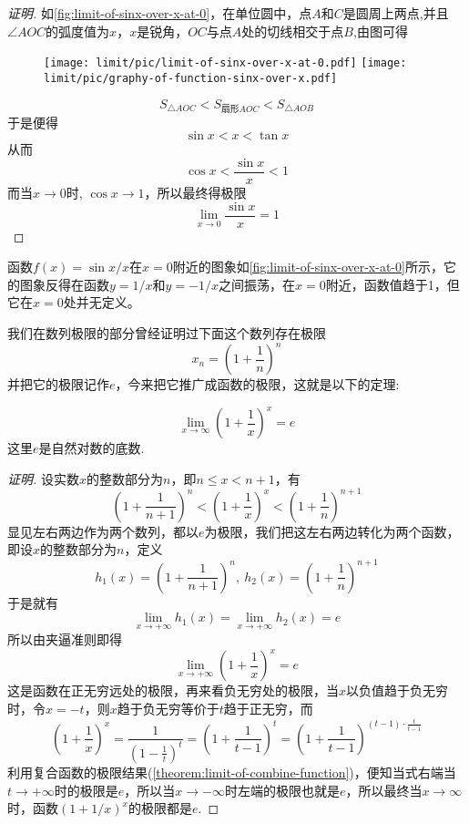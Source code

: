 \begin{proof}[证明]

  如\autoref{fig:limit-of-sinx-over-x-at-0}，在单位圆中，点$A$和$C$是圆周上两点,并且$\angle AOC$的弧度值为$x$，$x$是锐角，$OC$与点$A$处的切线相交于点$B$,由图可得
  
\begin{figure}[htbp]
\centering
\texttt{[image: limit/pic/limit-of-sinx-over-x-at-0.pdf]}
\texttt{[image: limit/pic/graphy-of-function-sinx-over-x.pdf]}
\caption{}
\label{fig:limit-of-sinx-over-x-at-0}
\end{figure}

  \[ S_{\triangle AOC} < S_{\text{扇形}AOC} < S_{\triangle AOB} \]
  于是便得
  \[ \sin{x} < x < \tan{x} \]
  从而
  \[ \cos{x} < \frac{\sin{x}}{x} < 1 \]
  而当$x \to 0$时, $\cos{x} \to 1$，所以最终得极限
  \[ \lim_{x \to 0} \frac{\sin{x}}{x} = 1 \]
\end{proof}

函数$f(x)=\sin{x}/x$在$x=0$附近的图象如\autoref{fig:limit-of-sinx-over-x-at-0}所示，它的图象反得在函数$y=1/x$和$y=-1/x$之间振荡，在$x=0$附近，函数值趋于1，但它在$x=0$处并无定义。

我们在数列极限的部分曾经证明过下面这个数列存在极限
\[ x_n = \left( 1+\frac{1}{n} \right)^n \]
并把它的极限记作$e$，今来把它推广成函数的极限，这就是以下的定理:
\begin{theorem}
  \[ \lim_{x \to \infty} \left( 1+\frac{1}{x} \right)^x = e \]
  这里$e$是自然对数的底数.
\end{theorem}

\begin{proof}[证明]
  设实数$x$的整数部分为$n$，即$n \leqslant x < n+1$，有
  \[ \left( 1+\frac{1}{n+1} \right)^n < \left( 1+\frac{1}{x} \right)^x < \left( 1+\frac{1}{n} \right)^{n+1} \]
  显见左右两边作为两个数列，都以$e$为极限，我们把这左右两边转化为两个函数，即设$x$的整数部分为$n$，定义
  \[ h_1(x) =  \left( 1+\frac{1}{n+1} \right)^n, \ h_2(x)=\left( 1+\frac{1}{n} \right)^{n+1} \]
  于是就有
  \[ \lim_{x \to +\infty} h_1(x) = \lim_{x \to +\infty} h_2(x) = e \]
  所以由夹逼准则即得
  \[ \lim_{x \to +\infty} \left( 1+\frac{1}{x} \right)^x = e \]
  这是函数在正无穷远处的极限，再来看负无穷处的极限，当$x$以负值趋于负无穷时，令$x=-t$，则$x$趋于负无穷等价于$t$趋于正无穷，而
  \[ \left( 1+\frac{1}{x} \right)^x = \frac{1}{\left( 1-\frac{1}{t} \right)^t} = \left( 1+\frac{1}{t-1} \right)^t = \left( 1+\frac{1}{t-1} \right)^{(t-1) \cdot \frac{t}{t-1}} \]
  利用复合函数的极限结果(\autoref{theorem:limit-of-combine-function})，便知当式右端当$t \to +\infty$时的极限是$e$，所以当$x \to -\infty$时左端的极限也就是$e$，所以最终当$x \to \infty$时，函数$(1+1/x)^x$的极限都是$e$.
\end{proof}


